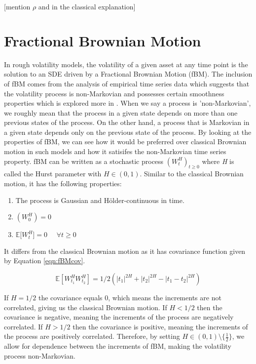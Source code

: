 \documentclass[12pt,oneside]{article}
\begin{document}
[mention $\rho$ and in the classical explanation]

\section{Fractional Brownian Motion}
\label{sec:fractionalBm}
In rough volatility models, the volatility of a given asset at any time point is the solution to an SDE driven by a Fractional Brownian Motion (fBM). The inclusion of fBM comes from the analysis of empirical time series data which suggests that the volatility process is non-Markovian and possesses certain smoothness properties which is explored more in \cite{gatheral2014volatility}. When we say a process is 'non-Markovian', we roughly mean that the process in a given state depends on more than one previous states of the process. On the other hand, a process that is Markovian in a given state depends only on the previous state of the process. By looking at the properties of fBM, we can see how it would be preferred over classical Brownian motion in such models and how it satisifes the non-Markovian time series property. fBM can be written as a stochastic process $(\textit{$W^H_t$})_{t\ge0}$ where \textit{H} is called the Hurst parameter with $\textit{H} \in (0,1)$. Similar to the classical Brownian motion, it has the following properties: 

\begin{enumerate} 
\item The process is Gaussian and H\"{o}lder-continuous in time. 
\item $(\textit{$W^H_0$})=0$  
\item $\mathbb{E}$[\textit{$W^H_t$}]$=0$ \ \  $\forall t \ge 0$ 
\end{enumerate}

It differs from the classical Brownian motion as it has covariance function given by Equation \ref{eqn:fBMcov}.

\begin{equation}
\label{eqn:fBMcov}
\mathbb{E}[W^H_{t_1}W^H_{t_2}]=1/2(|t_1|^{2H}+|t_2|^{2H}-|t_1-t_2|^{2H})
\end{equation}

If $H=1/2$ the covariance equals 0, which means the increments are not correlated, giving us the classical Brownian motion. If $H<1/2$ then the covariance is negative, meaning the increments of the process are negatively correlated. If $H>1/2$ then the covariance is positive, meaning the increments of the process are positively correlated.  Therefore, by setting $H\in(0,1)\setminus\{\frac{1}{2}\}$, we allow for dependence between the increments of fBM, making the volatility process non-Markovian.
\end{document}

